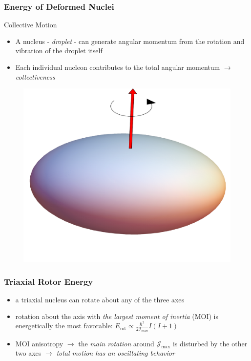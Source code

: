 \documentclass{beamer}
\begin{document}
\begin{frame}
  \frametitle{Energy of Deformed Nuclei}
    \begin{block}{Collective Motion}
      \begin{itemize}
        \item A nucleus - \emph{droplet} - can generate angular momentum from the rotation and vibration of the droplet itself
        \item Each individual nucleon contributes to the total angular momentum $\rightarrow$ \emph{collectiveness}
      \end{itemize}
    \end{block}
    \begin{figure}
      \centering
      \includegraphics[scale=0.26]{Figs/collective-rotation.pdf}
    \end{figure}
\end{frame}

\begin{frame}
  \frametitle{Triaxial Rotor Energy}
  \begin{itemize}
    \item a triaxial nucleus can rotate about any of the three axes
    \item rotation about the axis with \emph{the largest moment of inertia} (MOI) is energetically the most favorable: $E_\text{rot}\propto\frac{\hbar^2}{2\mathcal{I}_\text{max}}I(I+1 )$
    \item MOI anisotropy $\rightarrow$ the \emph{main rotation} around $\mathcal{J}_\text{max}$ is disturbed by the other two axes $\rightarrow$ {\color{red}\emph{total motion has an oscillating behavior}}
  \end{itemize}  
\end{frame}

\end{document}
